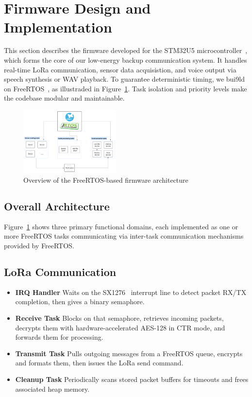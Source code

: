 \section{Firmware Design and Implementation}

This section describes the firmware developed for the STM32U5 microcontroller~\cite{stm32u5}, which forms the core of our low-energy backup communication system. It handles real-time LoRa communication, sensor data acquisistion, and voice output via speech synthesis or WAV playback. To guarantee deterministic timing, we bui9ld on FreeRTOS~\cite{freertos}, as illustraded in Figure~\ref{fig:firmware-system}. Task isolation and priority levels make the codebase modular and maintainable.

\begin{figure}[H]
\centering
\includegraphics[width=0.45\textwidth]{images/firmware-system-design.png}
\caption{Overview of the FreeRTOS-based firmware architecture}\label{fig:firmware-system}
\end{figure}

\subsection{Overall Architecture}

Figure~\ref{fig:firmware-system} shows three primary functional domains, each implemented as one or more FreeRTOS tasks communicating via inter-task communication mechanisms provided by FreeRTOS.

\subsection{LoRa Communication}
\begin{itemize}
  \item \textbf{IRQ Handler}
    Waits on the SX1276~\cite{sx1276} interrupt line to detect packet RX/TX completion, then gives a binary semaphore.
  \item \textbf{Receive Task}
    Blocks on that semaphore, retrieves incoming packets, decrypts them with hardware-accelerated AES-128 in CTR mode, and forwards them for processing.  
  \item \textbf{Transmit Task}
    Pulls outgoing messages from a FreeRTOS queue, encrypts and formats them, then issues the LoRa send command.
  \item \textbf{Cleanup Task}
    Periodically scans stored packet buffers for timeouts and frees associated heap memory.
\end{itemize}


